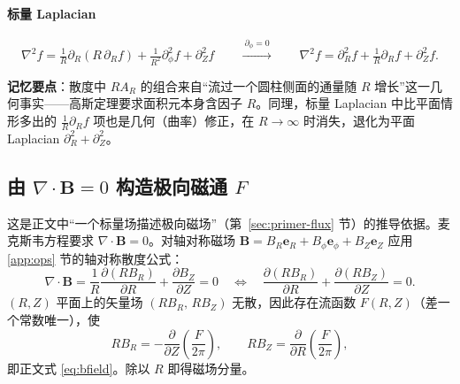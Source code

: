 \documentclass[12pt,fontset=none]{ctexart}
\numberwithin{equation}{section}
\numberwithin{table}{section}
\numberwithin{figure}{section}
\begin{document}
\paragraph{标量 Laplacian}
\[
  \nabla^2f=\tfrac{1}{R}\partial_R\!\left(R\,\partial_Rf\right)+\tfrac{1}{R^2}\partial_\phi^2f+\partial_Z^2f
  \qquad\xrightarrow{\ \partial_\phi=0\ }\qquad
  \nabla^2f=\partial_R^2f+\tfrac{1}{R}\partial_Rf+\partial_Z^2f .
\]

\textbf{记忆要点}：散度中 $RA_R$ 的组合来自``流过一个圆柱侧面的通量随 $R$ 增长''这一几何事实——高斯定理要求面积元本身含因子 $R$。同理，标量 Laplacian 中比平面情形多出的 $\frac{1}{R}\partial_R f$ 项也是几何（曲率）修正，在 $R\to\infty$ 时消失，退化为平面 Laplacian $\partial_R^2+\partial_Z^2$。

\subsection{\texorpdfstring{由 $\nabla\cdot\bm{B}=0$ 构造极向磁通 $F$}{由 div B = 0 构造极向磁通 F}}\label{app:flux}

这是正文中``一个标量场描述极向磁场''（第~\ref{sec:primer-flux} 节）的推导依据。麦克斯韦方程要求 $\nabla\cdot\bm{B}=0$。对轴对称磁场 $\bm{B}=B_R\bm{e}_R+B_\phi\bm{e}_\phi+B_Z\bm{e}_Z$ 应用 \ref{app:ops} 节的轴对称散度公式：
\[
  \nabla\cdot\bm{B}=\frac{1}{R}\frac{\partial(RB_R)}{\partial R}+\frac{\partial B_Z}{\partial Z}=0
  \quad\Longleftrightarrow\quad
  \frac{\partial(RB_R)}{\partial R}+\frac{\partial(RB_Z)}{\partial Z}=0 .
\]
$(R,Z)$ 平面上的矢量场 $(RB_R,\,RB_Z)$ 无散，因此存在流函数 $F(R,Z)$（差一个常数唯一），使
\[
  RB_R=-\frac{\partial}{\partial Z}\!\left(\frac{F}{2\pi}\right),\qquad
  RB_Z=\frac{\partial}{\partial R}\!\left(\frac{F}{2\pi}\right),
\]
即正文式 \eqref{eq:bfield}。除以 $R$ 即得磁场分量。
\end{document}

